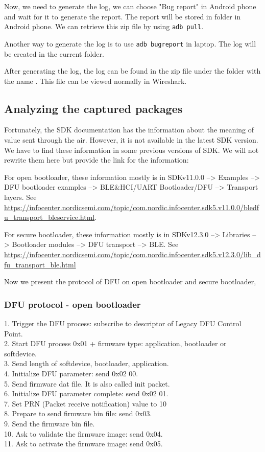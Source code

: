 \documentclass{article}
\theoremstyle{plain}
\theoremstyle{definition}
\numberwithin{equation}{section}
\begin{document}
Now, we need to generate the log, we can choose "Bug report" in Android phone and wait for it to generate the report. The report will be stored in folder  in Android phone. We can retrieve this zip file by using \texttt{adb pull}.

Another way to generate the log is to use \texttt{adb bugreport} in laptop. The log will be created in the current folder.

After generating the log, the log can be found in the zip file under the folder  with the name . This file can be viewed normally in Wireshark.

\subsection{Analyzing the captured packages}\label{analyze packages}

Fortunately, the SDK documentation has the information about the meaning of value sent through the air. However, it is not available in the latest SDK version. We have to find these information in some previous versions of SDK. We will not rewrite them here but provide the link for the information:

For open bootloader, these information mostly is in SDKv11.0.0 --> Examples --> DFU bootloader examples --> BLE\&HCI/UART Bootloader/DFU --> Transport layers. See
\url{https://infocenter.nordicsemi.com/topic/com.nordic.infocenter.sdk5.v11.0.0/bledfu_transport_bleservice.html}.


For secure bootloader, these information mostly is in SDKv12.3.0 --> Libraries --> Bootloader modules --> DFU transport --> BLE. See \url{https://infocenter.nordicsemi.com/topic/com.nordic.infocenter.sdk5.v12.3.0/lib_dfu_transport_ble.html}


Now we present the protocol of DFU on open bootloader and secure bootloader,
\subsubsection{DFU protocol - open bootloader} \label{protocol dfu open}

1. Trigger the DFU process: subscribe to descriptor of Legacy DFU Control Point.\\
2. Start DFU process 0x01 + firmware type: application, bootloader or softdevice.\\
3. Send length of softdevice, bootloader, application.\\
4. Initialize DFU parameter: send 0x02 00.\\
5. Send firmware dat file. It is also called init packet.\\
6. Initialize DFU parameter complete: send 0x02 01.\\
7. Set PRN (Packet receive notification) value to 10\\
8. Prepare to send firmware bin file: send 0x03.\\
9. Send the firmware bin file.\\
10. Ask to validate the firmware image: send 0x04.\\
11. Ask to activate the firmware image: send 0x05.
\end{document}
